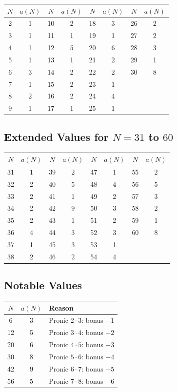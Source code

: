 \documentclass[11pt,a4paper]{article}
\theoremstyle{definition}
\begin{document}
\begin{center}
\begin{tabular}{cc|cc|cc|cc}
\toprule
$N$ & $a(N)$ & $N$ & $a(N)$ & $N$ & $a(N)$ & $N$ & $a(N)$ \\
\midrule
2 & 1 & 10 & 2 & 18 & 3 & 26 & 2 \\
3 & 1 & 11 & 1 & 19 & 1 & 27 & 2 \\
4 & 1 & 12 & 5 & 20 & 6 & 28 & 3 \\
5 & 1 & 13 & 1 & 21 & 2 & 29 & 1 \\
6 & 3 & 14 & 2 & 22 & 2 & 30 & 8 \\
7 & 1 & 15 & 2 & 23 & 1 & & \\
8 & 2 & 16 & 2 & 24 & 4 & & \\
9 & 1 & 17 & 1 & 25 & 1 & & \\
\bottomrule
\end{tabular}
\end{center}

\subsection{Extended Values for $N = 31$ to $60$}

\begin{center}
\begin{tabular}{cc|cc|cc|cc}
\toprule
$N$ & $a(N)$ & $N$ & $a(N)$ & $N$ & $a(N)$ & $N$ & $a(N)$ \\
\midrule
31 & 1 & 39 & 2 & 47 & 1 & 55 & 2 \\
32 & 2 & 40 & 5 & 48 & 4 & 56 & 5 \\
33 & 2 & 41 & 1 & 49 & 2 & 57 & 3 \\
34 & 2 & 42 & 9 & 50 & 3 & 58 & 2 \\
35 & 2 & 43 & 1 & 51 & 2 & 59 & 1 \\
36 & 4 & 44 & 3 & 52 & 3 & 60 & 8 \\
37 & 1 & 45 & 3 & 53 & 1 & & \\
38 & 2 & 46 & 2 & 54 & 4 & & \\
\bottomrule
\end{tabular}
\end{center}

\subsection{Notable Values}

\begin{center}
\begin{tabular}{ccl}
\toprule
$N$ & $a(N)$ & Reason \\
\midrule
6 & 3 & Pronic $2 \cdot 3$: bonus $+1$ \\
12 & 5 & Pronic $3 \cdot 4$: bonus $+2$ \\
20 & 6 & Pronic $4 \cdot 5$: bonus $+3$ \\
30 & 8 & Pronic $5 \cdot 6$: bonus $+4$ \\
42 & 9 & Pronic $6 \cdot 7$: bonus $+5$ \\
56 & 5 & Pronic $7 \cdot 8$: bonus $+6$ \\
\bottomrule
\end{tabular}
\end{center}
\end{document}
